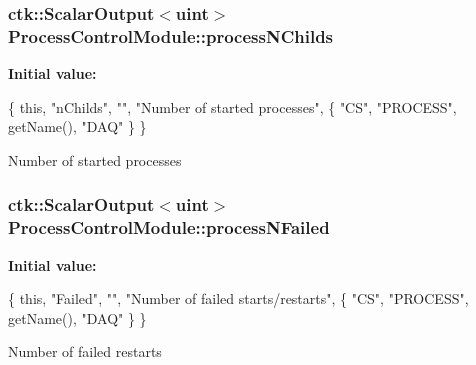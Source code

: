 \subsubsection[{\texorpdfstring{process\+N\+Childs}{processNChilds}}]{\setlength{\rightskip}{0pt plus 5cm}ctk\+::\+Scalar\+Output$<$uint$>$ Process\+Control\+Module\+::process\+N\+Childs}\hypertarget{structProcessControlModule_ad5ec578c8e25d6117e9c45de024319bc}{}\label{structProcessControlModule_ad5ec578c8e25d6117e9c45de024319bc}
{\bfseries Initial value\+:}
\begin{DoxyCode}
\{ \textcolor{keyword}{this}, \textcolor{stringliteral}{"nChilds"}, \textcolor{stringliteral}{""}, \textcolor{stringliteral}{"Number of started processes"},
    \{ \textcolor{stringliteral}{"CS"}, \textcolor{stringliteral}{"PROCESS"}, getName(), \textcolor{stringliteral}{"DAQ"} \} \}
\end{DoxyCode}
Number of started processes 
\subsubsection[{\texorpdfstring{process\+N\+Failed}{processNFailed}}]{\setlength{\rightskip}{0pt plus 5cm}ctk\+::\+Scalar\+Output$<$uint$>$ Process\+Control\+Module\+::process\+N\+Failed}\hypertarget{structProcessControlModule_a14a9aee3312baf85c8999c778b169039}{}\label{structProcessControlModule_a14a9aee3312baf85c8999c778b169039}
{\bfseries Initial value\+:}
\begin{DoxyCode}
\{ \textcolor{keyword}{this}, \textcolor{stringliteral}{"Failed"}, \textcolor{stringliteral}{""}, \textcolor{stringliteral}{"Number of failed starts/restarts"},
    \{ \textcolor{stringliteral}{"CS"}, \textcolor{stringliteral}{"PROCESS"}, getName(), \textcolor{stringliteral}{"DAQ"} \} \}
\end{DoxyCode}
Number of failed restarts 
